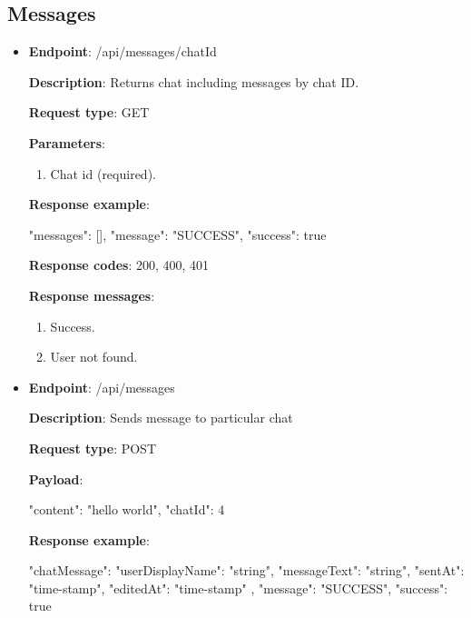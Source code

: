 \subsection{Messages}\label{subsec: messages}
\begin{itemize}
    \item \textbf{Endpoint}: /api/messages/{chatId}

    \textbf{Description}: Returns chat including messages by chat ID.

    \textbf{Request type}: GET

    \textbf{Parameters}:
    \begin{enumerate}
        \item Chat id (required).
    \end{enumerate}

    \textbf{Response example}:

    \begin{spverbatim}
    {
        "messages": [],
        "message": "SUCCESS",
        "success": true
    }
    \end{spverbatim}

    \textbf{Response codes}: 200, 400, 401

    \textbf{Response messages}:
    \begin{enumerate}
        \item Success.
        \item User not found.
    \end{enumerate}

    \item \textbf{Endpoint}: /api/messages

    \textbf{Description}: Sends message to particular chat

    \textbf{Request type}: POST

    \textbf{Payload}:

    \begin{spverbatim}
    {
        "content": "hello world",
        "chatId": 4
    }
    \end{spverbatim}

    \textbf{Response example}:

    \begin{spverbatim}
    {
        "chatMessage": {
        "userDisplayName": "string",
        "messageText": "string",
        "sentAt": "time-stamp",
        "editedAt": "time-stamp"
    },
        "message": "SUCCESS",
        "success": true
    }
    \end{spverbatim}


\end{itemize}
